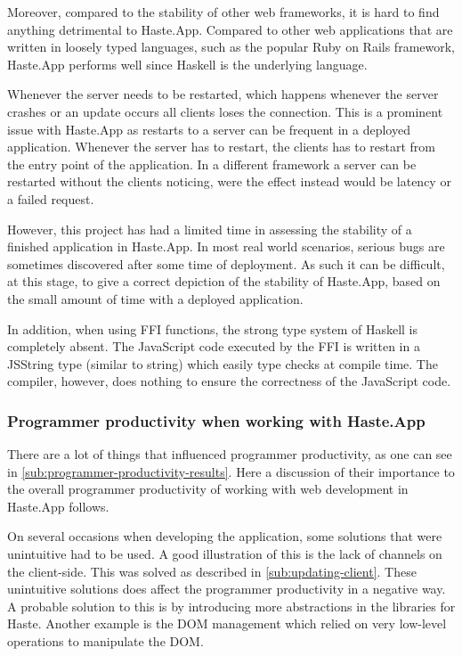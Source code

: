 \documentclass[a4paper]{article}
\begin{document}
Moreover, compared to the stability of other web frameworks, it is hard to find anything detrimental to Haste.App. Compared to other web applications that are written in loosely typed languages, such as the popular Ruby on Rails framework, Haste.App performs well since Haskell is the underlying language.

Whenever the server needs to be restarted, which happens whenever the server crashes or an update occurs all clients loses the connection. This is a prominent issue with Haste.App as restarts to a server can be frequent in a deployed application. Whenever the server has to restart, the clients has to restart from the entry point of the application. In a different framework a server can be restarted without the clients noticing, were the effect instead would be latency or a failed request.

However, this project has had a limited time in assessing the stability of a finished application in Haste.App. In most real world scenarios, serious bugs are sometimes discovered after some time of deployment. As such it can be difficult, at this stage, to give a correct depiction of the stability of Haste.App, based on the small amount of time with a deployed application. 

In addition, when using FFI functions, the strong type system of Haskell is completely absent. The JavaScript code executed by the FFI is written in a JSString type (similar to string) which easily type checks at compile time. The compiler, however, does nothing to ensure the correctness of the JavaScript code. 




\subsubsection{Programmer productivity when working with Haste.App}
There are a lot of things that influenced programmer productivity, as one can see in \cref{sub:programmer-productivity-results}. Here a discussion of their importance to the overall programmer productivity of working with web development in Haste.App follows.

On several occasions when developing the application, some solutions that were unintuitive had to be used. A good illustration of this is the lack of channels on the client-side. This was solved as described in \cref{sub:updating-client}. These unintuitive solutions does affect the programmer productivity in a negative way. A probable solution to this is by introducing more abstractions in the libraries for Haste. Another example is the DOM management which relied on very low-level operations to manipulate the DOM. 
\end{document}
